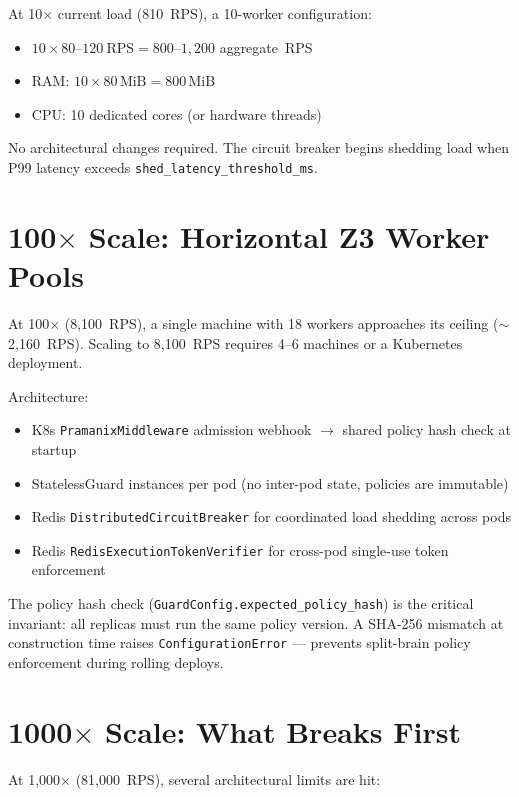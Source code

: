 \documentclass[12pt,a4paper,oneside]{report}
\newcommand{\code}[1]{\texttt{#1}}           %
\begin{document}
At 10$\times$ current load (810~RPS), a 10-worker configuration:
\begin{itemize}
  \item $10 \times 80\text{--}120\ \text{RPS} = 800\text{--}1{,}200$
        aggregate~RPS
  \item RAM: $10 \times 80\,\text{MiB} = 800\,\text{MiB}$
  \item CPU: 10 dedicated cores (or hardware threads)
\end{itemize}

No architectural changes required. The circuit breaker begins shedding load
when P99 latency exceeds \code{shed\_latency\_threshold\_ms}.

\section{100$\times$ Scale: Horizontal Z3 Worker Pools}

At 100$\times$ (8,100~RPS), a single machine with 18 workers approaches its
ceiling ($\sim$2,160~RPS). Scaling to 8,100~RPS requires 4--6 machines or a
Kubernetes deployment.

Architecture:
\begin{itemize}
  \item K8s \code{PramanixMiddleware} admission webhook $\to$ shared policy
        hash check at startup
  \item StatelessGuard instances per pod (no inter-pod state, policies are
        immutable)
  \item Redis \code{DistributedCircuitBreaker} for coordinated load shedding
        across pods
  \item Redis \code{RedisExecutionTokenVerifier} for cross-pod single-use
        token enforcement
\end{itemize}

The policy hash check (\code{GuardConfig.expected\_policy\_hash}) is the
critical invariant: all replicas must run the same policy version. A SHA-256
mismatch at construction time raises \code{ConfigurationError} --- prevents
split-brain policy enforcement during rolling deploys.

\section{1000$\times$ Scale: What Breaks First}

At 1,000$\times$ (81,000~RPS), several architectural limits are hit:
\end{document}
